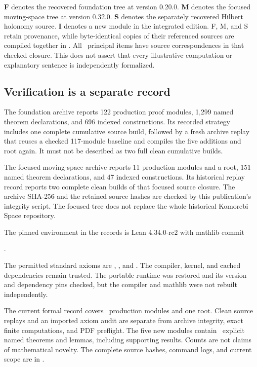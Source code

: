 \textbf{F} denotes the recovered foundation tree at version 0.20.0. \textbf{M} denotes the focused moving-space tree at version 0.32.0. \textbf{S} denotes the separately recovered Hilbert holonomy source. \textbf{I} denotes a new module in the integrated edition. F, M, and S retain provenance, while byte-identical copies of their referenced sources are compiled together in . All \EditionClaims\ principal items have source correspondences in that checked closure. This does not assert that every illustrative computation or explanatory sentence is independently formalized.



\par\noindent\begin{minipage}{\linewidth}\subsection{Verification is a separate record}
The foundation archive reports 122 production proof modules, 1,299 named theorem declarations, and 696 indexed constructions. Its recorded strategy includes one complete cumulative source build, followed by a fresh archive replay that reuses a checked 117-module baseline and compiles the five additions and root again. It must not be described as two full clean cumulative builds.

The focused moving-space archive reports 11 production modules and a root, 151 named theorem declarations, and 47 indexed constructions. Its historical replay record reports two complete clean builds of that focused source closure. The archive SHA-256 and the retained source hashes are checked by this publication's integrity script. The focused tree does not replace the whole historical Komorebi Space repository.

The pinned environment in the records is Lean 4.34.0-rc2 with mathlib commit\par\smallskip\noindent{}.\par\smallskip The permitted standard axioms are , , and . The compiler, kernel, and cached dependencies remain trusted. The portable runtime was restored and its version and dependency pins checked, but the compiler and mathlib were not rebuilt independently.

The current formal record covers \EditionFormalModules\ production modules and one root. Clean source replays and an imported axiom audit are separate from archive integrity, exact finite computations, and PDF preflight. The five new modules contain \EditionNewTheorems\ explicit named theorems and lemmas, including supporting results. Counts are not claims of mathematical novelty. The complete source hashes, command logs, and current scope are in .

\end{minipage}
